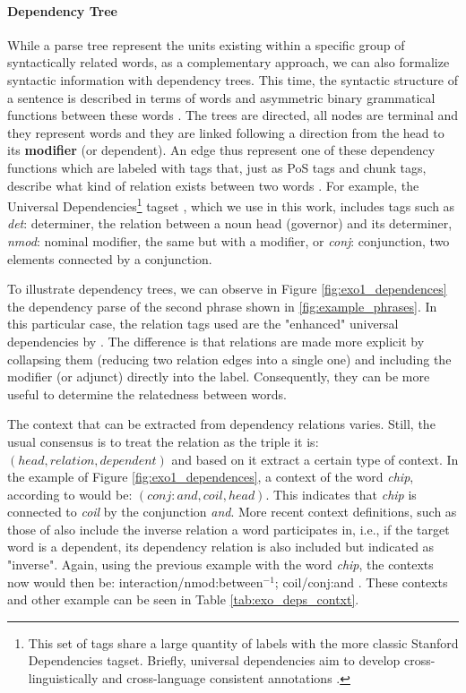 \paragraph{Dependency Tree}
While  a parse tree represent the units existing within a specific group of syntactically related words, as a complementary approach, we can also formalize syntactic information with dependency trees. This time, the syntactic structure of a sentence is described in terms of words and asymmetric binary grammatical functions between these words   \cite{ClarkBook2010}. The trees are directed, all nodes are terminal and they represent words and they are linked following a direction from the head to its \textbf{modifier} (or dependent). An edge thus represent one of these dependency functions which are labeled  with tags that, just as PoS tags and chunk tags, describe what kind of relation exists between two words \cite{bird2006nltk}. For example, the Universal Dependencies\footnote{This set of tags share a large quantity of labels with the more classic Stanford Dependencies \cite{de2006generating,de2008stanford} tagset. Briefly, universal dependencies aim to develop cross-linguistically and cross-language consistent annotations  \cite{nivre2016universal}.} tagset \cite{nivre2016universal,schuster2016enhanced}, which we use in this work, includes tags such as  \textit{det}: determiner, the relation between a noun head (governor) and its determiner, \textit{nmod}: nominal modifier, the same but with a modifier, or \textit{conj}: conjunction, two elements connected by a conjunction.

To illustrate dependency trees, we can observe in Figure \ref{fig:exo1_dependences} the dependency parse of the second phrase shown in \ref{fig:example_phrases}. In this particular case, the relation tags used are the "enhanced" universal dependencies by \cite{schuster2016enhanced}. The difference is that relations are made more explicit by collapsing them (reducing two relation edges into a single one)  and including the modifier  (or adjunct) directly into the label. Consequently, they can be more useful to determine the relatedness between words.

The context that can be extracted from dependency relations varies. Still, the usual consensus is to treat the relation as the triple it is: $(head, relation, dependent)$ and based on it extract a certain type of context. In the example of Figure \ref{fig:exo1_dependences}, a context of the word  \textit{chip}, according to \cite{Lin1997} would be: $(conj:and,coil,head)$. This indicates that \textit{chip} is connected to \textit{coil} by the conjunction \textit{and}. More recent context definitions, such as those of \cite{baroni2010distributional,LevyG14,Panchenko2017} also include the inverse relation a word participates in, i.e., if the target word is a dependent, its dependency relation is also included but indicated as "inverse".  Again, using the previous example with the  word \textit{chip}, the  contexts now would then be: interaction/nmod:between$^{-1}$; coil/conj:and . These contexts and other example can be seen in Table \ref{tab:exo_deps_contxt}.


